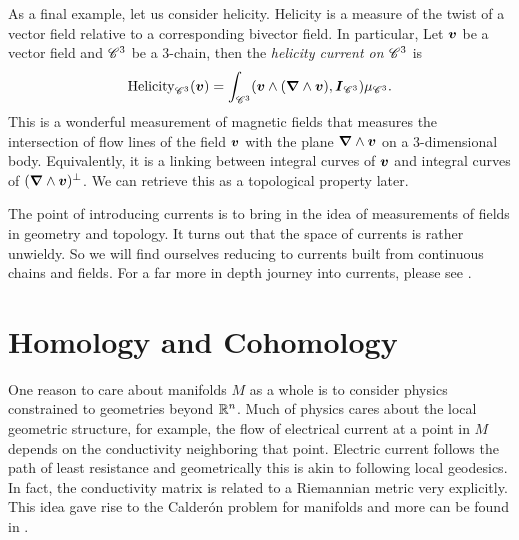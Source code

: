 \documentclass{article}
\begin{document}
\begin{example}[Helicity]
As a final example, let us consider helicity. Helicity is a measure of the twist of a vector field relative to a corresponding bivector field. In particular, Let $\boldsymbol{v}$ be a vector field and $\mathscr{C}^3$ be a 3-chain, then the \emph{helicity current on $\mathscr{C}^3$} is
\begin{equation}
    \mathrm{Helicity}_{\mathscr{C}^3}(\boldsymbol{v}) = \int_{\mathscr{C}^3}(\boldsymbol{v} \wedge (\boldsymbol{\nabla} \wedge \boldsymbol{v}), \boldsymbol{I}_{\mathscr{C}^3})\mu_{\mathscr{C}^3}.
\end{equation}
This is a wonderful measurement of magnetic fields that measures the intersection of flow lines of the field $\boldsymbol{v}$ with the plane $\boldsymbol{\nabla} \wedge\boldsymbol{v}$ on a 3-dimensional body. Equivalently, it is a linking between integral curves of $\boldsymbol{v}$ and integral curves of $(\boldsymbol{\nabla} \wedge \boldsymbol{v})^\perp$. We can retrieve this as a topological property later.
\end{example}

The point of introducing currents is to bring in the idea of measurements of fields in geometry and topology. It turns out that the space of currents is rather unwieldy. So we will find ourselves reducing to currents built from continuous chains and fields. For a far more in depth journey into currents, please see \cite{giaquinta_cartesian_1998}.


\section{Homology and Cohomology}\label{sec:homology_and_cohomology}

One reason to care about manifolds $M$ as a whole is to consider physics constrained to geometries beyond $\mathbb{R}^n$. Much of physics cares about the local geometric structure, for example, the flow of electrical current at a point in $M$ depends on the conductivity neighboring that point. Electric current follows the path of least resistance and geometrically this is akin to following local geodesics. In fact, the conductivity matrix is related to a Riemannian metric very explicitly. This idea gave rise to the Calder\'on problem for manifolds and more can be found in .
\end{document}
